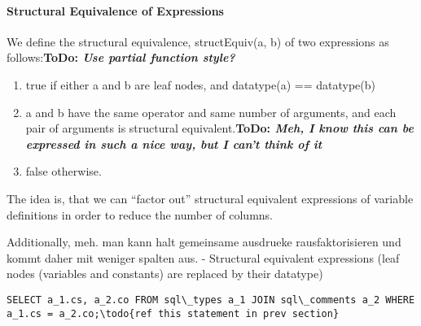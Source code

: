\documentclass[a4paper,twoside,bibtotoc,abstracton,12pt,BCOR=15mm]{scrreprt}
\newcommand{\todo}[1]{\textbf{ToDo: \textit{#1}}}
\begin{document}
\paragraph{Structural Equivalence of Expressions} We define the structural equivalence, structEquiv(a, b) of two expressions as follows:\todo{Use partial function style?}
\begin{enumerate}
  \item true if either a and b are leaf nodes, and datatype(a) == datatype(b)
  \item a and b have the same operator and same number of arguments, and each pair of arguments is structural equivalent.\todo{Meh, I know this can be expressed in such a nice way, but I can't think of it} 
  \item false otherwise.
\end{enumerate}
The idea is, that we can ``factor out'' structural equivalent expressions of variable definitions in order to reduce the number of columns.


Additionally, meh. man kann halt gemeinsame ausdrueke rausfaktorisieren und kommt daher mit weniger spalten aus.
- Structural equivalent expressions (leaf nodes (variables and constants) are replaced by their datatype) 



\begin{verbatim}
SELECT a_1.cs, a_2.co FROM sql\_types a_1 JOIN sql\_comments a_2 WHERE a_1.cs = a_2.co;\todo{ref this statement in prev section}
\end{verbatim}
\end{document}

